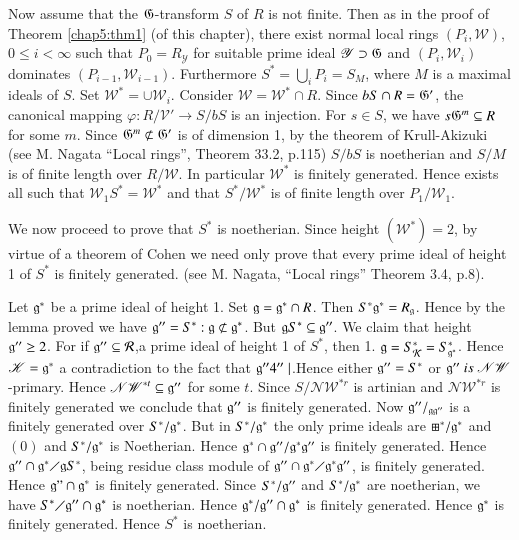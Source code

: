     Now assume that the $\mathfrak{G}$-transform $S$ of $R$ is not
    finite. Then as in the proof of Theorem \ref{chap5:thm1} (of this chapter),
    there exist normal local rings $(P_i,\mathscr{W})$, $0 \le i <
    \infty $ such that $P_0 =R_\mathscr{Y}$ for suitable prime ideal
    $\mathscr{Y} \supset \mathfrak{G}$ and $(P_{i},\mathscr{W}_i)$ dominates
    $(P_{i-1},\mathscr{W}_{i-1})$. Furthermore $S^* =\underset{i}\bigcup
    P_i=S_M$, where $M$ is a maximal ideals of $S$. Set
    $\mathscr{W}^\ast = \cup \mathscr{W}_i$. Consider $\mathscr{W} =
    \mathscr{W}^* \cap R$. Since $bS \cap R = \mathfrak{G}'$, the canonical
    mapping $\varphi: R/\mathscr{V}' \to S / bS$ is an injection. For
    $s \in S$, we have $s \mathfrak{G} ^m \subseteq R$ for some $m$. Since
    $\mathfrak{G}^m \not\subset \mathfrak{G}'$ is of dimension 1, by the theorem of
    Krull-Akizuki (see M. Nagata ``Local rings'', Theorem 33.2, p.115)
    $S/bS$ is noetherian and $S/M$ is of finite length over $R
    /\mathscr{W}$. In particular $\mathscr{W}^*$ is finitely
    generated. Hence exists all such that $\mathscr{W}_1 S^* =
    \mathscr{W}^*$ and that $S^* / \mathscr{W}^*$ is of finite length
    over $P_1/ \mathscr{W}_1$.

We now proceed to prove that $S^*$ is noetherian. Since height
$(\mathscr{W}^*) = 2$, by virtue of a theorem of Cohen we need only
prove that every prime ideal of height 1 of $S^*$ is finitely
generated. (see M. Nagata, ``Local rings'' Theorem 3.4, p.8).

Let $\mathfrak{g}^*$ be a prime ideal of height 1. Set $\mathfrak{g} = \mathfrak{g}^* \cap
R$. Then $S^* \mathfrak{g}^* = R_{\mathfrak{g}}$. Hence by the lemma proved we have
$\mathfrak{g}''= S^* : \mathfrak{g} \not\subset \mathfrak{g}^*$. But $\mathfrak{g} S^* \subseteq
\mathfrak{g}''$. We claim that height $\mathfrak{g}'' \geq 2$. For  
 if $\mathfrak{g}'' \subseteq \mathcal{R}$,\pageoriginale a prime ideal
        of height 1 of $S^*$, then 1. $\mathfrak{g}=S^*_\mathcal{K}=S^*_{\mathfrak{g}^*}$. Hence
        $\mathscr{K}=\mathfrak{g}^*$ a contradiction to the fact that
        $\mathfrak{g}'' 4'' \mid $.Hence either $\mathfrak{g}''=S^*$ or
        $\mathfrak{g}'' ~ is~\mathscr{NW}$-primary. Hence
        $\mathscr{NW}^{*t}\subseteq \mathfrak{g}''$ for some $t$. Since
        $S/\mathscr{NW}^{*r}$ is artinian and $\mathscr{NW}^{*r}$ is
        finitely generated we conclude that $\mathfrak{g}''$ is finitely
        generated. Now $\mathfrak{g}''/_{\mathfrak{g} \mathfrak{g}''}$ is a
        finitely generated over $S^*/\mathfrak{g}^*$. But in
        $S^*/\mathfrak{g}^*$ the only prime ideals are $\boxplus ^* /
        \mathfrak{g}^*$ and $(0)$ and $S^*/ \mathfrak{g}^*$ is
        Noetherian. Hence $\mathfrak{g}^* \cap \mathfrak{g}''
        /\mathfrak{g}^* \mathfrak{g}''$ is finitely generated. Hence
        $\mathfrak{g}'' \cap \mathfrak{g}^* \diagup \mathfrak{g} S^*$,
        being residue class module of $\mathfrak{g}'' \cap \mathfrak{g}^*
        \diagup \mathfrak{g}^* \mathfrak{g}''$, is finitely
        generated. Hence $\mathfrak{g}" \cap \mathfrak{g}^*$ is finitely
        generated. Since $S^*/\mathfrak{g}''$ and $S^*/\mathfrak{g}^*$
        are noetherian, we have $S^* \diagup \mathfrak{g}''\cap
        \mathfrak{g}^*$ is noetherian. Hence $\mathfrak{g}^*
        /\mathfrak{g}'' \cap  \mathfrak{g}^*$ is finitely
        generated. Hence $\mathfrak{g}^*$ is finitely generated. Hence
        $S^*$ is noetherian. 
    
